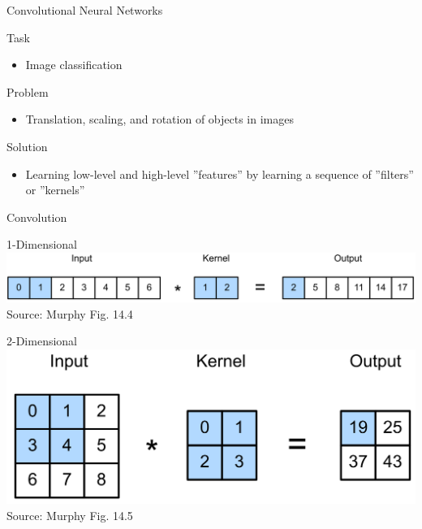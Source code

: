 \documentclass[ignorenonframetext,xcolor=x11names]{beamer}
\begin{document}
\begin{frame}{Convolutional Neural Networks}
\begin{block}{Task}
\begin{itemize}
   \item Image classification
\end{itemize}
\end{block}
\begin{block}{Problem}
\begin{itemize}
   \item Translation, scaling, and rotation of objects in images
\end{itemize}
\end{block}
\begin{block}{Solution}
\begin{itemize}
   \item Learning low-level and high-level ''features'' by learning a sequence of ''filters'' or ''kernels''
\end{itemize}
\end{block}
\end{frame}

\begin{frame}{Convolution}
\begin{block}{1-Dimensional}
\centering
\includegraphics[width=\textwidth]{screen1.png} \\

\scriptsize Source: Murphy Fig. 14.4 \normalsize
\end{block}
\begin{block}{2-Dimensional}
\centering
\includegraphics[width=.8\textwidth]{screen2.png} \\

\scriptsize Source: Murphy Fig. 14.5
\end{block}
\end{frame}
\end{document}
